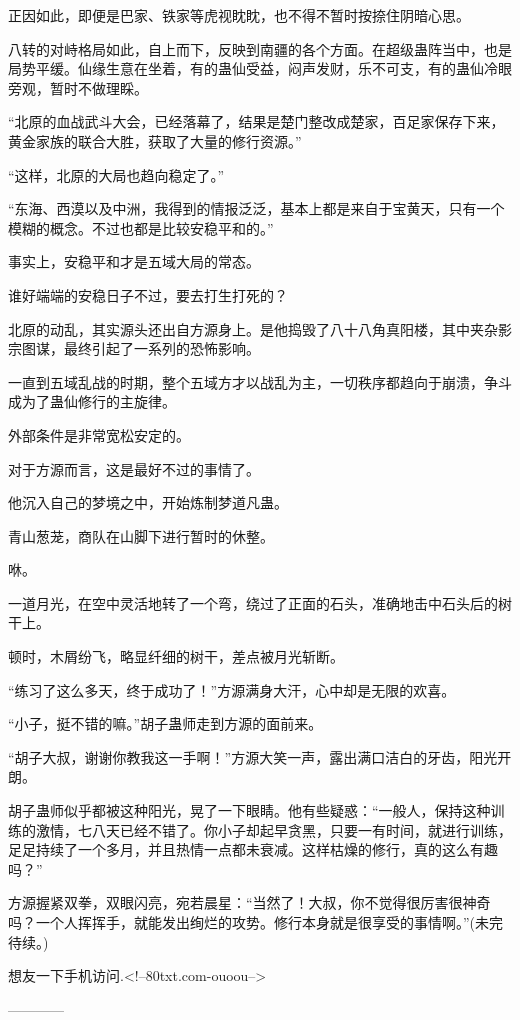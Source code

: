 \begin{this_body}
正因如此，即便是巴家、铁家等虎视眈眈，也不得不暂时按捺住阴暗心思。

八转的对峙格局如此，自上而下，反映到南疆的各个方面。在超级蛊阵当中，也是局势平缓。仙缘生意在坐着，有的蛊仙受益，闷声发财，乐不可支，有的蛊仙冷眼旁观，暂时不做理睬。

“北原的血战武斗大会，已经落幕了，结果是楚门整改成楚家，百足家保存下来，黄金家族的联合大胜，获取了大量的修行资源。”

“这样，北原的大局也趋向稳定了。”

“东海、西漠以及中洲，我得到的情报泛泛，基本上都是来自于宝黄天，只有一个模糊的概念。不过也都是比较安稳平和的。”

事实上，安稳平和才是五域大局的常态。

谁好端端的安稳日子不过，要去打生打死的？

北原的动乱，其实源头还出自方源身上。是他捣毁了八十八角真阳楼，其中夹杂影宗图谋，最终引起了一系列的恐怖影响。

一直到五域乱战的时期，整个五域方才以战乱为主，一切秩序都趋向于崩溃，争斗成为了蛊仙修行的主旋律。

外部条件是非常宽松安定的。

对于方源而言，这是最好不过的事情了。

他沉入自己的梦境之中，开始炼制梦道凡蛊。

青山葱茏，商队在山脚下进行暂时的休整。

咻。

一道月光，在空中灵活地转了一个弯，绕过了正面的石头，准确地击中石头后的树干上。

顿时，木屑纷飞，略显纤细的树干，差点被月光斩断。

“练习了这么多天，终于成功了！”方源满身大汗，心中却是无限的欢喜。

“小子，挺不错的嘛。”胡子蛊师走到方源的面前来。

“胡子大叔，谢谢你教我这一手啊！”方源大笑一声，露出满口洁白的牙齿，阳光开朗。

胡子蛊师似乎都被这种阳光，晃了一下眼睛。他有些疑惑：“一般人，保持这种训练的激情，七八天已经不错了。你小子却起早贪黑，只要一有时间，就进行训练，足足持续了一个多月，并且热情一点都未衰减。这样枯燥的修行，真的这么有趣吗？”

方源握紧双拳，双眼闪亮，宛若晨星：“当然了！大叔，你不觉得很厉害很神奇吗？一个人挥挥手，就能发出绚烂的攻势。修行本身就是很享受的事情啊。”(未完待续。)

想友一下手机访问.<!--80txt.com-ouoou-->

------------

\end{this_body}

